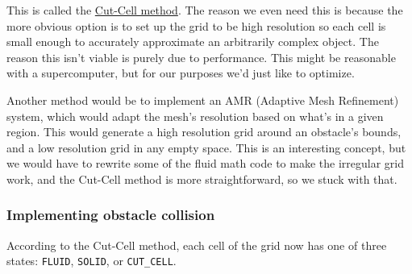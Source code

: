 \documentclass[a4paper,12pt,titlepage]{article}
\begin{document}
This is called the \href{https://www.sciencedirect.com/science/article/pii/S0307904X00000056}{Cut-Cell method}. The reason we even need this is because
the more obvious option is to set up the grid to be high resolution so each cell
is small enough to accurately approximate an arbitrarily complex object. The
reason this isn't viable is purely due to performance. This might be reasonable
with a supercomputer, but for our purposes we'd just like to optimize.

Another method would be to implement an AMR (Adaptive Mesh Refinement) system,
which would adapt the mesh's resolution based on what's in a given region. This would
generate a high resolution grid around an obstacle's bounds, and a low resolution
grid in any empty space. This is an interesting concept, but we would have to
rewrite some of the fluid math code to make the irregular grid work, and the Cut-Cell
method is more straightforward, so we stuck with that. %

\subsubsection{Implementing obstacle collision}
According to the Cut-Cell method, each cell of the grid now has one of three states:
\lstinline{FLUID}, \lstinline{SOLID}, or \lstinline{CUT_CELL}.
\end{document}
